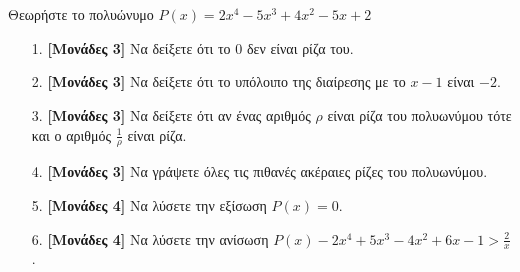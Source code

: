 \documentclass[12pt]{article}
\begin{document}
\part*{}

Θεωρήστε το πολυώνυμο $P(x)=2x^4-5x^3+4x^2-5x+2$
\begin{enumerate}
 \item[1.] \textbf{[Μονάδες 3]} Να δείξετε ότι το 0 δεν είναι ρίζα του.
 \item[2.] \textbf{[Μονάδες 3]} Να δείξετε ότι το υπόλοιπο της διαίρεσης με το $x-1$ είναι $-2$.
 \item[3.] \textbf{[Μονάδες 3]} Να δείξετε ότι αν ένας αριθμός $ρ$ είναι ρίζα του πολυωνύμου τότε και ο αριθμός $\frac{1}{ρ}$ είναι ρίζα.
 \item[4.] \textbf{[Μονάδες 3]} Να γράψετε όλες τις πιθανές ακέραιες ρίζες του πολυωνύμου.
 \item[5.] \textbf{[Μονάδες 4]} Να λύσετε την εξίσωση $P(x)=0$.
 \item[6.] \textbf{[Μονάδες 4]} Να λύσετε την ανίσωση $P(x)-2x^4+5x^3-4x^2+6x-1>\frac{2}{x}$.
\end{enumerate}
\end{document}

